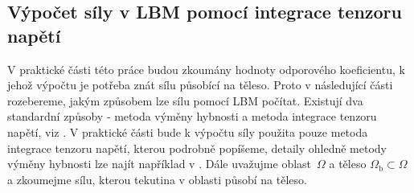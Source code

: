 \subsection{Výpočet síly v LBM pomocí integrace tenzoru napětí}\label{sim}
V praktické části této práce budou zkoumány hodnoty odporového koeficientu, k jehož výpočtu je potřeba znát sílu působící na těleso. Proto v následující části rozebereme, jakým způsobem lze sílu pomocí LBM počítat. Existují dva standardní způsoby - metoda výměny hybnosti a metoda integrace tenzoru napětí, viz \cite{NASA}. V praktické části bude k výpočtu síly použita pouze metoda integrace tenzoru napětí, kterou podrobně popíšeme, detaily ohledně metody výměny hybnosti lze najít například v \cite{NASA}. Dále uvažujme oblast~$ \Omega $ a těleso $ \Omega_{\mathrm{b}} \subset \Omega $ a zkoumejme sílu, kterou tekutina v oblasti působí na těleso.

